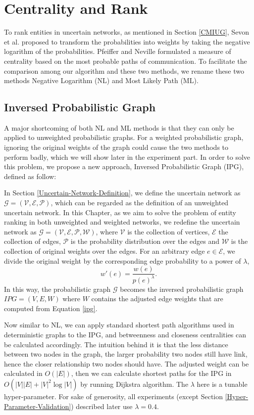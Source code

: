 \documentclass[\main/thesis.tex]{subfiles}
\begin{document}
\chapter{Centrality and Rank}
To rank entities in uncertain networks, as mentioned in Section \ref{CMIUG}, Sevon et al. \cite{sevon2006link} proposed to transform the probabilities into weights by taking the negative logarithm of the probabilities. Pfeiffer and Neville \cite{pfeiffer2010probabilistic} formulated a measure of centrality based on the most probable paths of communication. To facilitate the comparison among our algorithm and these two methods, we rename these two methods Negative Logarithm (NL) and Most Likely Path (ML).

\section{Inversed Probabilistic Graph} \label{Inversed-Probabilistic-Graph}

A major shortcoming of both NL and ML methods is that they can only be applied to unweighted probabilistic graphs. For a weighted probabilistic graph, ignoring the original weights of the graph could cause the two methods to perform badly, which we will show later in the experiment part. In order to solve this problem, we propose a new approach, Inversed Probabilistic Graph (IPG), defined as follow:

In Section \ref{Uncertain-Network-Definition}, we define the uncertain network as $\mathcal{G = (V,E,P)}$, which can be regarded as the definition of an unweighted uncertain network. In this Chapter, as we aim to solve the problem of entity ranking in both unweighted and weighted networks, we redefine the uncertain network as $\mathcal{G = (V,E,P,W)}$, where $\mathcal{V}$ is the collection of vertices, $\mathcal{E}$ the collection of edges, $\mathcal{P}$ is the probability distribution over the edges and $\mathcal{W}$ is the collection of original weights over the edges. For an arbitrary edge $e \in \mathcal{E}$, we divide the original weight by the corresponding edge probability to a power of $\lambda$,
\begin{equation}
w'(e) = \frac{w(e)}{p(e)^\lambda }. \label{ipg}
\end{equation}
In this way, the probabilistic graph $\mathcal{G}$ becomes the inversed probabilistic graph $IPG = (V, E, W)$ where $W$ contains the adjusted edge weights that are computed from Equation \ref{ipg}.

Now similar to NL, we can apply standard shortest path algorithms used in deterministic graphs to the IPG, and betweenness and closeness centralities can be calculated accordingly. The intuition behind it is that the less distance between two nodes in the graph, the larger probability two nodes still have link, hence the closer relationship two nodes should have. The adjusted weight can be calculated in $O(|E|)$, then we can calculate shortest paths for the IPG in $O(|V||E|+|V|^2 \log|V|)$ by running Dijkstra algorithm. The $\lambda$ here is a tunable hyper-parameter. For sake of generosity, all experiments (except Section \ref{Hyper-Parameter-Validation}) described later use $\lambda = 0.4$. 
\end{document}
